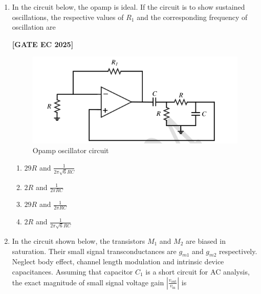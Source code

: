 \documentclass[12pt]{article}
\begin{document}
\begin{enumerate}[leftmargin=1.5em, label=\textbf{Q.\arabic*}., itemsep=2em]
\item In the circuit below, the opamp is ideal. If the circuit is to show sustained oscillations, the respective values of $R_1$ and the corresponding frequency of oscillation are

\noindent \textbf{[GATE EC 2025]}
\begin{figure}[H]\centering
\includegraphics[width=0.65\columnwidth]{figs/q50.png}
\caption{Opamp oscillator circuit}
\label{fig:q50}
\end{figure}
\begin{multicols}{2}
\begin{enumerate}
    \item $29R$ and $\tfrac{1}{2\pi\sqrt{6}RC}$
    \item $2R$ and $\tfrac{1}{2\pi RC}$
    \item $29R$ and $\tfrac{1}{2\pi RC}$
    \item $2R$ and $\tfrac{1}{2\pi\sqrt{6}RC}$
\end{enumerate}
\end{multicols}

\item In the circuit shown below, the transistors $M_1$ and $M_2$ are biased in saturation. Their small signal transconductances are $g_{m1}$ and $g_{m2}$ respectively. Neglect body effect, channel length modulation and intrinsic device capacitances. Assuming that capacitor $C_1$ is a short circuit for AC analysis, the exact magnitude of small signal voltage gain $\left|\tfrac{v_{\text{out}}}{v_{\text{in}}}\right|$ is


\end{enumerate}
\end{document}
